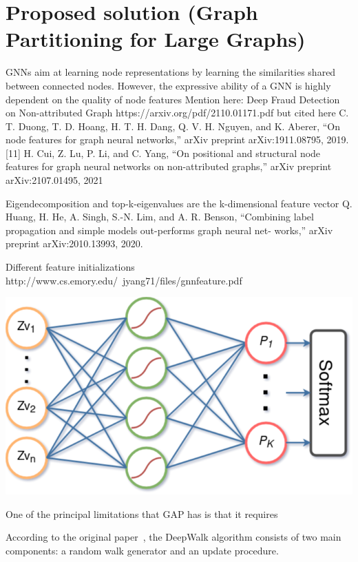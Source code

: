 %
%
\let\textcircled=\pgftextcircled
\chapter{Proposed solution (Graph Partitioning for Large Graphs)}
\label{Chapter3}
GNNs aim at learning node
representations by learning the similarities shared between
connected nodes. However, the expressive ability of a GNN
is highly dependent on the quality of node features
Mention here: Deep Fraud Detection on Non-attributed Graph
https://arxiv.org/pdf/2110.01171.pdf
but cited here
C. T. Duong, T. D. Hoang, H. T. H. Dang, Q. V. H. Nguyen, and
K. Aberer, “On node features for graph neural networks,” arXiv preprint
arXiv:1911.08795, 2019.
[11] H. Cui, Z. Lu, P. Li, and C. Yang, “On positional and structural node
features for graph neural networks on non-attributed graphs,” arXiv
preprint arXiv:2107.01495, 2021

Eigendecomposition and top-k-eigenvalues are the k-dimensional feature vector
Q. Huang, H. He, A. Singh, S.-N. Lim, and A. R. Benson, “Combining
label propagation and simple models out-performs graph neural net-
works,” arXiv preprint arXiv:2010.13993, 2020.

Different feature initializations
http://www.cs.emory.edu/~jyang71/files/gnnfeature.pdf

\begin{center}
    \includegraphics[scale=0.5]{partitioning_module}
\end{center}

One of the principal limitations that GAP has is that it requires 

According to the original paper~\cite{deepwalk}, the DeepWalk algorithm consists of two main components: a random walk generator and an update procedure. 

